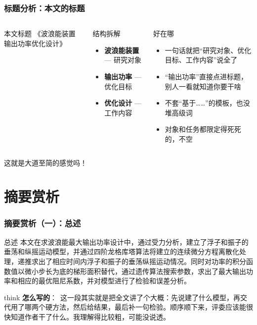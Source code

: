 \documentclass[aspectratio=169]{beamer}
\newcommand{\remark}[2]{%
	\vspace{0.12cm}%
	\begin{beamercolorbox}[rounded=true,sep=6pt]{think}%
		{\color{orchidpurple}\textbf{#1}：}~#2%
	\end{beamercolorbox}%
}
\begin{document}
\begin{frame}
	\frametitle{标题分析：本文的标题}
	\small
	\begin{columns}[T]
		\begin{block}{本文标题}
			\centering《波浪能装置输出功率优化设计》
		\end{block}
		\begin{alertblock}{结构拆解}
			\begin{itemize}
				\item \textbf{波浪能装置} --- 研究对象
				\item \textbf{输出功率} --- 优化目标
				\item \textbf{优化设计} --- 工作内容
			\end{itemize}
		\end{alertblock}

		\begin{exampleblock}{好在哪}
			\begin{itemize}
				\item 一句话就把``研究对象、优化目标、工作内容''说全了
				\item ``输出功率''直接点进标题，别人一看就知道你要干啥
				\item 不套``基于……''的模板，也没堆高级词
				\item 对象和任务都限定得死死的，不空
			\end{itemize}
		\end{exampleblock}
	\end{columns}
	\begin{center}
		这就是大道至简的感觉吗！
	\end{center}
\end{frame}

\section{摘要赏析}
\begin{frame}
	\frametitle{摘要赏析（一）：总述}
	\small
	\begin{block}{总述}
		本文在求波浪能最大输出功率设计中，通过受力分析，建立了浮子和振子的垂荡和纵摇运动模型，并通过四阶龙格库塔算法将建立的连续微分方程离散化处理，递推求出了相应时间内浮子和振子的垂荡纵摇运动情况。同时对功率的积分函数值以微小步长为底的梯形面积替代，通过遗传算法搜索参数，求出了最大输出功率和相应的最优阻尼系数，并对模型进行了检验和误差分析。
	\end{block}
	\medskip
	\remark{怎么写的}{这一段其实就是把全文讲了个大概：先说建了什么模型，再交代用了哪两个硬方法，然后给结果，最后补一句检验。顺序顺下来，评委应该能很快知道作者干了什么。我理解得比较粗，可能没说透。}
\end{frame}
\end{document}
